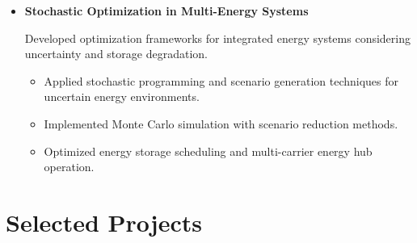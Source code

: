 \documentclass[letter,20pt]{article}
\begin{document}
\begin{itemize}
\begin{itemize}
[
noitemsep,
leftmargin=4ex
]


\item
Implemented time-series forecasting models using historical PV generation and weather data.

\item
Engineered temporal and physical features including solar radiation, temperature, wind speed, and historical power profiles.

\item
Evaluated forecasting performance using machine learning and deep learning approaches.


\end{itemize}



\vspace{10pt}



\item[]
\textbf{
Stochastic Optimization in Multi-Energy Systems
}



\vspace{4pt}


Developed optimization frameworks for integrated energy systems considering uncertainty and storage degradation.



\begin{itemize}
[
noitemsep,
leftmargin=4ex
]


\item
Applied stochastic programming and scenario generation techniques for uncertain energy environments.

\item
Implemented Monte Carlo simulation with scenario reduction methods.

\item
Optimized energy storage scheduling and multi-carrier energy hub operation.


\end{itemize}



\end{itemize}


\section{\textbf{Selected Projects}}
\end{document}
